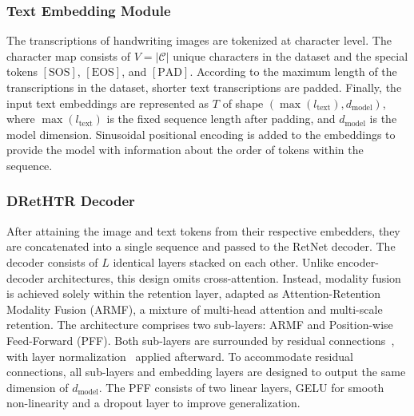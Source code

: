 \documentclass[times, review, 10pt]{elsarticle}
\begin{document}
\subsubsection{Text Embedding Module}
The transcriptions of handwriting images are tokenized at character level. The character map consists of \( V = |\mathcal{C}| \) unique characters in the dataset and the special tokens \([\text{SOS}]\), \([\text{EOS}]\), and \([\text{PAD}]\). According to the maximum length of the transcriptions in the dataset, shorter text transcriptions are padded. Finally, the input text embeddings are represented as \( {T} \) of shape \( (\max(l_{\text{text}}), d_{\text{model}}) \), where \( \max(l_{\text{text}}) \) is the fixed sequence length after padding, and \( d_{\text{model}} \) is the model dimension. Sinusoidal positional encoding is added to the embeddings to provide the model with information about the order of tokens within the sequence.

\subsubsection{DRetHTR Decoder}
After attaining the image and text tokens from their respective embedders, they are concatenated into a single sequence and passed to the RetNet decoder. The decoder consists of  \(L\) identical layers stacked on each other. Unlike encoder-decoder architectures, this design omits cross-attention. Instead, modality fusion is achieved solely within the retention layer, adapted as Attention-Retention Modality Fusion (ARMF), a mixture of multi-head attention and multi-scale retention. The architecture comprises two sub-layers: ARMF and Position-wise Feed-Forward (PFF). Both sub-layers are surrounded by residual connections~\cite{residual}, with layer normalization~\cite{layernorm} applied afterward. To accommodate residual connections, all sub-layers and embedding layers are designed to output the same dimension of $d_\text{model}$. The PFF consists of two linear layers, GELU for smooth non-linearity and a dropout layer to improve generalization.
\end{document}
